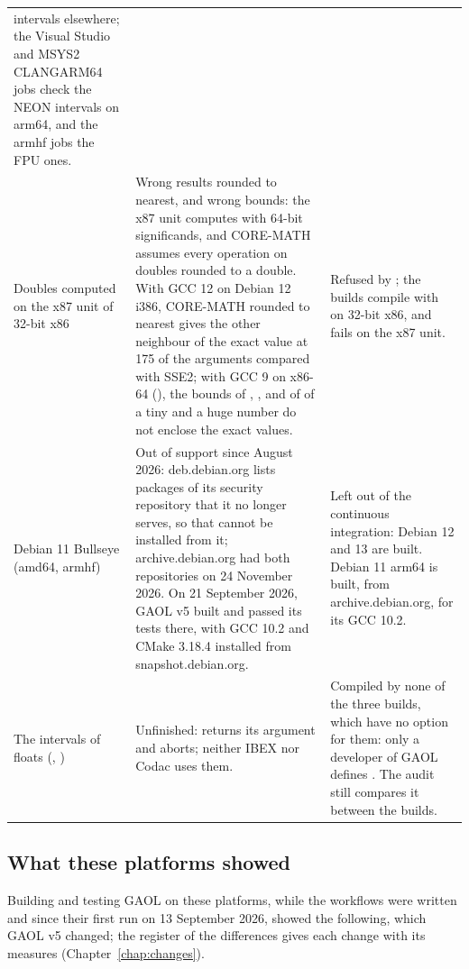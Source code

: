 \begin{longtable}{L{2.9cm}L{5.8cm}L{5cm}}
    intervals elsewhere; the Visual Studio and MSYS2 CLANGARM64 jobs check
    the NEON intervals on arm64, and the armhf jobs the FPU ones.\\
  Doubles computed on the x87 unit of 32-bit x86 & Wrong results rounded to
    nearest, and wrong bounds: the x87 unit computes with 64-bit
    significands, and CORE-MATH assumes every operation on doubles rounded
    to a double. With GCC 12 on Debian 12 i386, CORE-MATH rounded to nearest
    gives the other neighbour of the exact value at 175 of the arguments
    compared with SSE2; with GCC 9 on x86-64 (), the
    bounds of , ,  and
    of  of a tiny and a huge number do not enclose the exact
    values. & Refused by ; the builds compile with
     on 32-bit x86, and
     fails on the x87 unit.\\
  Debian 11 Bullseye (amd64, armhf) & Out of support since August 2026:
    deb.debian.org lists packages of its security repository that it no
    longer serves, so that  cannot be installed from it;
    archive.debian.org had both repositories on 24 November 2026. On 21
    September 2026, GAOL v5 built and passed its tests there, with GCC 10.2
    and CMake 3.18.4 installed from snapshot.debian.org. & Left out of the
    continuous integration: Debian 12 and 13 are built. Debian 11 arm64 is
    built, from archive.debian.org, for its GCC 10.2.\\
  The intervals of floats (,
    )
    & Unfinished:  returns its argument and
     aborts; neither IBEX nor Codac uses them.
    & Compiled by none of the three builds, which have no option for them:
    only a developer of GAOL defines . The
    audit still compares it between the builds.\\
\end{longtable}
\endgroup

\subsection{What these platforms showed}\label{sec:ci-showed}

Building and testing GAOL on these platforms, while the workflows were
written and since their first run on 13 September 2026, showed the
following, which GAOL v5 changed; the register of the differences gives each
change with its measures (Chapter~\ref{chap:changes}).

